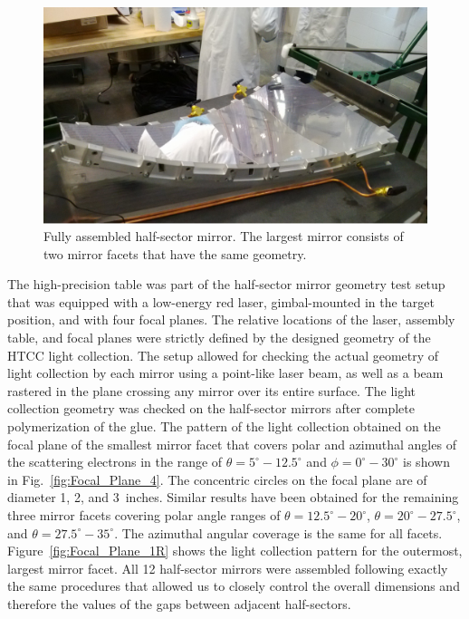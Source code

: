 \begin{figure}[ht]
    \centering
    \includegraphics[width=1.0\linewidth]{images/Half-sector.png}
    \caption{Fully assembled half-sector mirror. The largest mirror consists of two mirror facets that have the
      same geometry.}
    \label{fig:Half-sector}
\end{figure}

The high-precision table was part of the half-sector mirror geometry test setup that was equipped with a
low-energy red laser, gimbal-mounted in the target position, and with four focal planes. The relative locations
of the laser, assembly table, and focal planes were strictly defined by the designed geometry of the HTCC
light collection. The setup allowed for checking the actual geometry of light collection by each mirror using a
point-like laser beam, as well as a beam rastered in the plane crossing any mirror over its entire surface. The
light collection geometry was checked on the half-sector mirrors after complete polymerization of the glue.
The pattern of the light collection obtained on the focal plane of the smallest mirror facet that covers polar and
azimuthal angles of the scattering electrons in the range of $\theta = 5^\circ - 12.5^\circ$ and
$\phi = 0^\circ - 30^\circ$ is shown in Fig.~\ref{fig:Focal_Plane_4}. The concentric circles on the focal plane
are of diameter 1, 2, and 3~inches. Similar results have been obtained for the remaining three mirror facets
covering polar angle ranges of $\theta = 12.5^\circ - 20^\circ$, $\theta = 20^\circ - 27.5^\circ$, and
$\theta = 27.5^\circ - 35^\circ$. The azimuthal angular coverage is the same for all facets.
Figure~\ref{fig:Focal_Plane_1R} shows the light collection pattern for the outermost, largest mirror facet.
All 12 half-sector mirrors were assembled following exactly the same procedures that allowed us to closely
control the overall dimensions and therefore the values of the gaps between adjacent half-sectors. 

